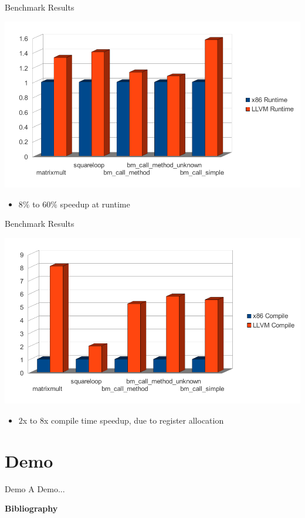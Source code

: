\documentclass{beamer}
\begin{document}
\begin{frame}{Benchmark Results}
  \begin{center}
    \includegraphics[scale=.63]{./include/pdf/runtime.pdf}
  \end{center}
  \begin{itemize}
  \item $8\%$ to $60\%$ speedup at runtime
  \end{itemize}
\end{frame}

\begin{frame}{Benchmark Results}
  \begin{center}
    \includegraphics[scale=.63]{./include/pdf/compiletime.pdf}
  \end{center}
  \begin{itemize}
  \item $2$x to $8$x compile time speedup\pause, due to register allocation
  \end{itemize}
\end{frame}

\section{Demo}

\begin{frame}{Demo}
  A Demo...
\end{frame}

\begin{frame}[t,allowframebreaks]{\bf Bibliography}
  \nocite{*}
  \printbibliography
\end{frame}
\end{document}
